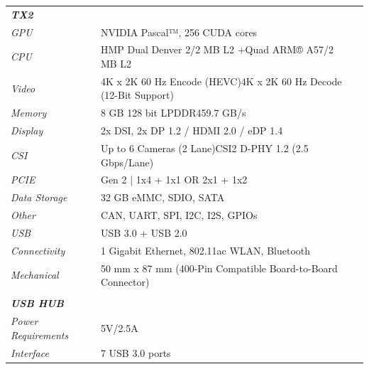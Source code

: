 \documentclass[]{article}
\begin{document}
\begin{table}[H]
	\centering
	\begin{tabular}{lll}
		\textit{\textbf{TX2}}             &                                                                  &  \\
		\textit{GPU}                      & NVIDIA Pascal™, 256 CUDA cores                                   &  \\
		\textit{CPU}                      & HMP Dual Denver 2/2 MB L2 +Quad ARM® A57/2 MB L2                 &  \\
		\textit{Video}                    & 4K x 2K 60 Hz Encode (HEVC)4K x 2K 60 Hz Decode (12-Bit Support) &  \\
		\textit{Memory}                   & 8 GB 128 bit LPDDR459.7 GB/s                                     &  \\
		\textit{Display}                  & 2x DSI, 2x DP 1.2 / HDMI 2.0 / eDP 1.4                           &  \\
		\textit{CSI}                      & Up to 6 Cameras (2 Lane)CSI2 D-PHY 1.2 (2.5 Gbps/Lane)           &  \\
		\textit{PCIE}                     & Gen 2 | 1x4 + 1x1 OR 2x1 + 1x2                                   &  \\
		\textit{Data Storage}             & 32 GB eMMC, SDIO, SATA                                           &  \\
		\textit{Other}                    & CAN, UART, SPI, I2C, I2S, GPIOs                                  &  \\
		\textit{USB}                      & USB 3.0 + USB 2.0                                                &  \\
		\textit{Connectivity}             & 1 Gigabit Ethernet, 802.11ac WLAN, Bluetooth                     &  \\
		\textit{Mechanical}               & 50 mm x 87 mm (400-Pin Compatible Board-to-Board Connector)      &  \\
		\textit{}                         &                                                                  &  \\
		\textit{\textbf{USB HUB}}         &                                                                  &  \\
		\textit{Power Requirements}       & 5V/2.5A                                                          &  \\
		\textit{Interface}                & 7 USB 3.0 ports                                                  &  \\

\end{tabular}
\end{table}
\end{document}
